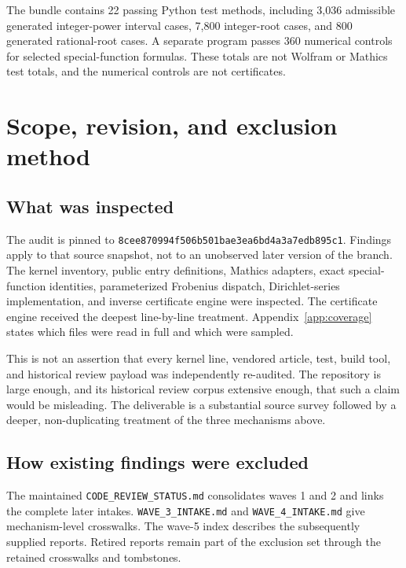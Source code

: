 \documentclass[11pt,a4paper]{article}
\newcommand{\code}[1]{\nolinkurl{#1}}
\newcommand{\rev}{8cee870994f506b501bae3ea6bd4a3a7edb895c1}
\begin{document}
The bundle contains 22 passing Python test methods, including 3,036 admissible generated integer-power interval cases, 7,800 integer-root cases, and 800 generated rational-root cases. A separate program passes 360 numerical controls for selected special-function formulas. These totals are not Wolfram or Mathics test totals, and the numerical controls are not certificates.

\clearpage
{\small\setlength{\parskip}{0pt}\setlength{\baselineskip}{10.5pt}\tableofcontents}
\clearpage

\section{Scope, revision, and exclusion method}
\subsection{What was inspected}

The audit is pinned to \texttt{\rev}. Findings apply to that source snapshot, not to an unobserved later version of the branch. The kernel inventory, public entry definitions, Mathics adapters, exact special-function identities, parameterized Frobenius dispatch, Dirichlet-series implementation, and inverse certificate engine were inspected. The certificate engine received the deepest line-by-line treatment. Appendix~\ref{app:coverage} states which files were read in full and which were sampled.

This is not an assertion that every kernel line, vendored article, test, build tool, and historical review payload was independently re-audited. The repository is large enough, and its historical review corpus extensive enough, that such a claim would be misleading. The deliverable is a substantial source survey followed by a deeper, non-duplicating treatment of the three mechanisms above.

\subsection{How existing findings were excluded}

The maintained \code{CODE_REVIEW_STATUS.md} consolidates waves 1 and 2 and links the complete later intakes. \code{WAVE_3_INTAKE.md} and \code{WAVE_4_INTAKE.md} give mechanism-level crosswalks. The wave-5 index describes the subsequently supplied reports. Retired reports remain part of the exclusion set through the retained crosswalks and tombstones.\cite{register,wave3,wave4,wave5}
\end{document}
